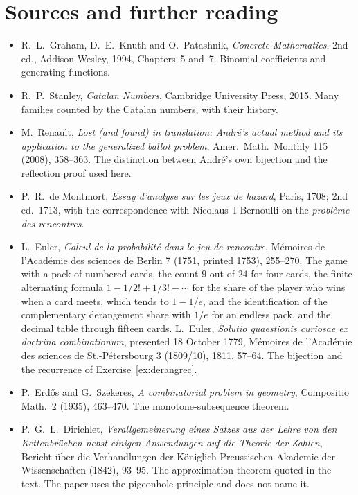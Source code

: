 \section*{Sources and further reading}
\begin{itemize}\raggedright
\item R.~L.~Graham, D.~E.~Knuth and O.~Patashnik, \emph{Concrete Mathematics}, 2nd ed., Addison-Wesley, 1994, Chapters~5 and~7. Binomial coefficients and generating functions.
\item R.~P.~Stanley, \emph{Catalan Numbers}, Cambridge University Press, 2015. Many families counted by the Catalan numbers, with their history.
\item M.~Renault, \emph{Lost (and found) in translation: Andr\'e's actual method and its application to the generalized ballot problem}, Amer.\ Math.\ Monthly 115 (2008), 358--363. The distinction between Andr\'e's own bijection and the reflection proof used here.
\item P.~R.~de Montmort, \emph{Essay d'analyse sur les jeux de hazard}, Paris, 1708; 2nd ed.\ 1713, with the correspondence with Nicolaus~I Bernoulli on the \emph{probl\`eme des rencontres}.
\item L.~Euler, \emph{Calcul de la probabilit\'e dans le jeu de rencontre}, M\'emoires de l'Acad\'emie des sciences de Berlin 7 (1751, printed 1753), 255--270. The game with a pack of numbered cards, the count $9$ out of $24$ for four cards, the finite alternating formula $1-1/2!+1/3!-\cdots$ for the share of the player who wins when a card meets, which tends to $1-1/e$, and the identification of the complementary derangement share with $1/e$ for an endless pack, and the decimal table through fifteen cards. L.~Euler, \emph{Solutio quaestionis curiosae ex doctrina combinationum}, presented 18 October 1779, M\'emoires de l'Acad\'emie des sciences de St.-P\'etersbourg 3 (1809/10), 1811, 57--64. The bijection and the recurrence of Exercise~\ref{ex:derangrec}.
\item P.~Erd\H{o}s and G.~Szekeres, \emph{A combinatorial problem in geometry}, Compositio Math.\ 2 (1935), 463--470. The monotone-subsequence theorem.
\item P.~G.~L.~Dirichlet, \emph{Verallgemeinerung eines Satzes aus der Lehre von den Kettenbr\"uchen nebst einigen Anwendungen auf die Theorie der Zahlen}, Bericht \"uber die Verhandlungen der K\"oniglich Preussischen Akademie der Wissenschaften (1842), 93--95. The approximation theorem quoted in the text. The paper uses the pigeonhole principle and does not name it.
\end{itemize}
